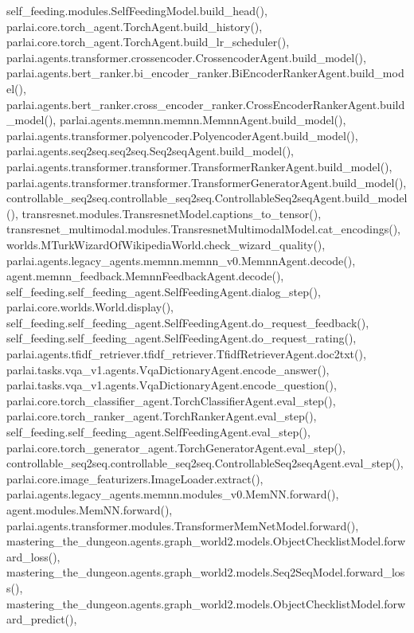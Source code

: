 self\+\_\+feeding.\+modules.\+Self\+Feeding\+Model.\+build\+\_\+head(), parlai.\+core.\+torch\+\_\+agent.\+Torch\+Agent.\+build\+\_\+history(), parlai.\+core.\+torch\+\_\+agent.\+Torch\+Agent.\+build\+\_\+lr\+\_\+scheduler(), parlai.\+agents.\+transformer.\+crossencoder.\+Crossencoder\+Agent.\+build\+\_\+model(), parlai.\+agents.\+bert\+\_\+ranker.\+bi\+\_\+encoder\+\_\+ranker.\+Bi\+Encoder\+Ranker\+Agent.\+build\+\_\+model(), parlai.\+agents.\+bert\+\_\+ranker.\+cross\+\_\+encoder\+\_\+ranker.\+Cross\+Encoder\+Ranker\+Agent.\+build\+\_\+model(), parlai.\+agents.\+memnn.\+memnn.\+Memnn\+Agent.\+build\+\_\+model(), parlai.\+agents.\+transformer.\+polyencoder.\+Polyencoder\+Agent.\+build\+\_\+model(), parlai.\+agents.\+seq2seq.\+seq2seq.\+Seq2seq\+Agent.\+build\+\_\+model(), parlai.\+agents.\+transformer.\+transformer.\+Transformer\+Ranker\+Agent.\+build\+\_\+model(), parlai.\+agents.\+transformer.\+transformer.\+Transformer\+Generator\+Agent.\+build\+\_\+model(), controllable\+\_\+seq2seq.\+controllable\+\_\+seq2seq.\+Controllable\+Seq2seq\+Agent.\+build\+\_\+model(), transresnet.\+modules.\+Transresnet\+Model.\+captions\+\_\+to\+\_\+tensor(), transresnet\+\_\+multimodal.\+modules.\+Transresnet\+Multimodal\+Model.\+cat\+\_\+encodings(), worlds.\+M\+Turk\+Wizard\+Of\+Wikipedia\+World.\+check\+\_\+wizard\+\_\+quality(), parlai.\+agents.\+legacy\+\_\+agents.\+memnn.\+memnn\+\_\+v0.\+Memnn\+Agent.\+decode(), agent.\+memnn\+\_\+feedback.\+Memnn\+Feedback\+Agent.\+decode(), self\+\_\+feeding.\+self\+\_\+feeding\+\_\+agent.\+Self\+Feeding\+Agent.\+dialog\+\_\+step(), parlai.\+core.\+worlds.\+World.\+display(), self\+\_\+feeding.\+self\+\_\+feeding\+\_\+agent.\+Self\+Feeding\+Agent.\+do\+\_\+request\+\_\+feedback(), self\+\_\+feeding.\+self\+\_\+feeding\+\_\+agent.\+Self\+Feeding\+Agent.\+do\+\_\+request\+\_\+rating(), parlai.\+agents.\+tfidf\+\_\+retriever.\+tfidf\+\_\+retriever.\+Tfidf\+Retriever\+Agent.\+doc2txt(), parlai.\+tasks.\+vqa\+\_\+v1.\+agents.\+Vqa\+Dictionary\+Agent.\+encode\+\_\+answer(), parlai.\+tasks.\+vqa\+\_\+v1.\+agents.\+Vqa\+Dictionary\+Agent.\+encode\+\_\+question(), parlai.\+core.\+torch\+\_\+classifier\+\_\+agent.\+Torch\+Classifier\+Agent.\+eval\+\_\+step(), parlai.\+core.\+torch\+\_\+ranker\+\_\+agent.\+Torch\+Ranker\+Agent.\+eval\+\_\+step(), self\+\_\+feeding.\+self\+\_\+feeding\+\_\+agent.\+Self\+Feeding\+Agent.\+eval\+\_\+step(), parlai.\+core.\+torch\+\_\+generator\+\_\+agent.\+Torch\+Generator\+Agent.\+eval\+\_\+step(), controllable\+\_\+seq2seq.\+controllable\+\_\+seq2seq.\+Controllable\+Seq2seq\+Agent.\+eval\+\_\+step(), parlai.\+core.\+image\+\_\+featurizers.\+Image\+Loader.\+extract(), parlai.\+agents.\+legacy\+\_\+agents.\+memnn.\+modules\+\_\+v0.\+Mem\+N\+N.\+forward(), agent.\+modules.\+Mem\+N\+N.\+forward(), parlai.\+agents.\+transformer.\+modules.\+Transformer\+Mem\+Net\+Model.\+forward(), mastering\+\_\+the\+\_\+dungeon.\+agents.\+graph\+\_\+world2.\+models.\+Object\+Checklist\+Model.\+forward\+\_\+loss(), mastering\+\_\+the\+\_\+dungeon.\+agents.\+graph\+\_\+world2.\+models.\+Seq2\+Seq\+Model.\+forward\+\_\+loss(), mastering\+\_\+the\+\_\+dungeon.\+agents.\+graph\+\_\+world2.\+models.\+Object\+Checklist\+Model.\+forward\+\_\+predict(), 